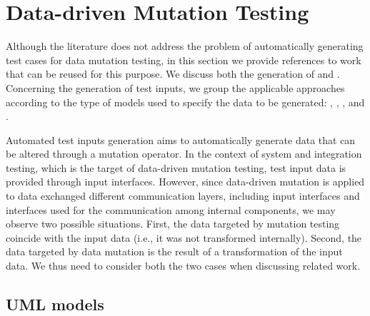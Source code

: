 
\section{Data-driven Mutation Testing}
\label{sec:testGenerationData}



Although the literature does not address the problem of automatically generating test cases for data mutation testing, in this section we provide references to work that can be reused for this purpose.
We discuss both the generation of  and .
Concerning the generation of test inputs, we group the applicable approaches according to the type of models used to specify the data to be generated: , , , and .

Automated test inputs generation aims to automatically generate data that can be altered through a mutation operator.
In the context of system and integration testing, which is the target of data-driven mutation testing, test input data is provided through input interfaces. However, since data-driven mutation is applied to data exchanged different communication layers, including input interfaces and interfaces used for the communication among internal components, we may observe two possible situations. First, the data targeted by mutation testing coincide with the input data (i.e., it was not transformed internally). Second, the data targeted by data mutation is the result of a transformation of the input data. We thus need to consider both the two cases when discussing related work.

\subsection{UML models}





